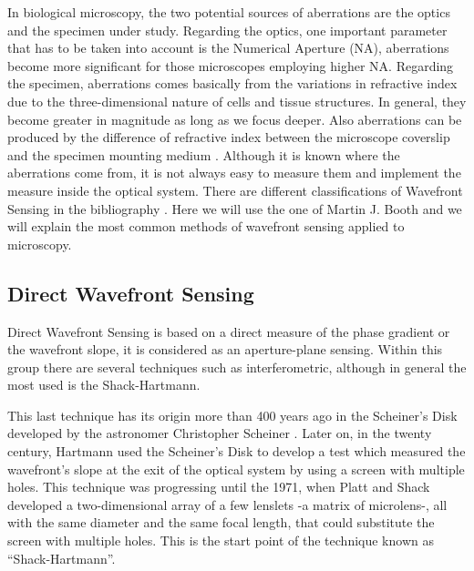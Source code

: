 In biological microscopy, the two potential sources of aberrations are the optics and the specimen under study. Regarding the optics, one important parameter that has to be taken into account is the Numerical Aperture (NA), aberrations become more significant for those microscopes employing higher NA. Regarding the specimen, aberrations comes basically from the variations in refractive index due to the three-dimensional nature of cells and tissue structures. In general, they become greater in magnitude as long as we focus deeper. Also aberrations can be produced by the difference of refractive index between the microscope coverslip and the specimen mounting medium \cite{AOM_basic_ref}. 
Although it is known where the aberrations come from, it is not always easy to measure them and implement the measure inside the optical system. There are different classifications of Wavefront Sensing in the bibliography \cite{AO_engineering_handbook}. Here we will use the one of Martin J. Booth \cite{AOM_basic_ref} and we will explain the most common methods of wavefront sensing applied to microscopy.      


\subsection{Direct Wavefront Sensing}
\label{sec:WavefrontSensing}
Direct Wavefront Sensing is based on a direct measure of the phase gradient or the wavefront slope, it is considered as an aperture-plane sensing. Within this group there are several techniques such as interferometric, although in general the most used is the Shack-Hartmann. 


This last technique has its origin more than 400 years ago in the Scheiner's Disk developed by the astronomer Christopher Scheiner \cite{Principles_HS}. Later on, in the twenty century, Hartmann used the Scheiner's Disk to develop a test which measured the wavefront's slope at the exit of the optical system by using a screen with multiple holes. This technique was progressing until the 1971, when Platt and Shack developed a two-dimensional array of a few lenslets -a matrix of microlens-, all with the same diameter and the same focal length, that could substitute the screen with multiple holes. This is the start point of the technique known as "`Shack-Hartmann"'\cite{History_HS}.
  
